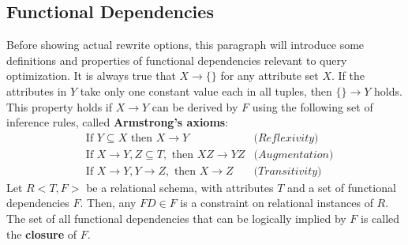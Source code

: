 \subsection{Functional Dependencies}
Before showing actual rewrite options, this paragraph will introduce some definitions and properties of functional dependencies relevant to query optimization.
It is always true that $X \rightarrow \{\}$ for any attribute set $X$. If the attributes in $Y$ take only one constant value each in all tuples, then $\{\} \rightarrow Y$ holds.
This property holds if $X \rightarrow Y$ can be derived by $F$ using the following set of inference rules, called \textbf{Armstrong's axioms}:
\begin{align*}
    &\text{If } Y \subseteq X \text{ then } X \rightarrow Y &\textit{(Reflexivity)} \\
    &\text{If } X \rightarrow Y, Z \subseteq T, \text{ then } XZ \rightarrow YZ &\textit{(Augmentation)} \\
    &\text{If } X \rightarrow Y, Y \rightarrow Z, \text{ then } X \rightarrow Z &\textit{(Transitivity)}
\end{align*}
Let $R<T,F>$ be a relational schema, with attributes $T$ and a set of functional dependencies $F$. Then, any $FD \in F$ is a constraint on relational instances of $R$. The set of all functional dependencies that can be logically implied by $F$ is called the \textbf{closure} of $F$.
